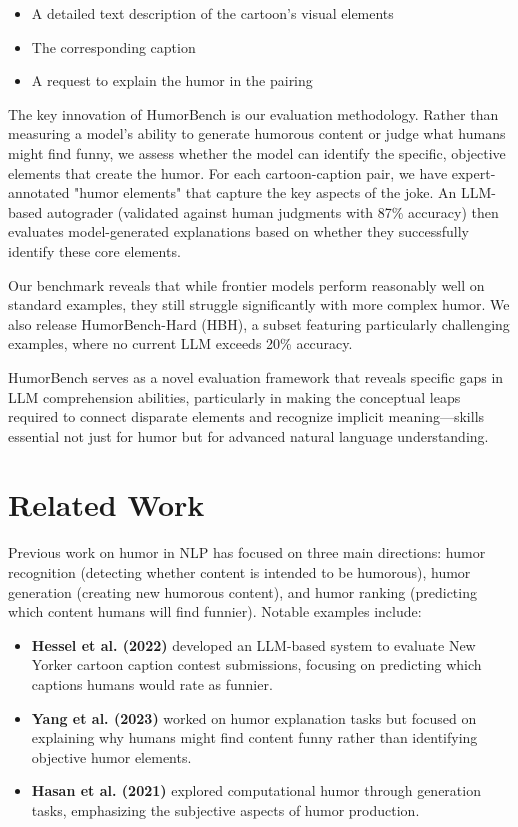 \documentclass[twocolumn]{article}
\begin{document}
\begin{itemize}
    \item A detailed text description of the cartoon's visual elements
    \item The corresponding caption
    \item A request to explain the humor in the pairing
\end{itemize}

The key innovation of HumorBench is our evaluation methodology. Rather than measuring a model's ability to generate humorous content or judge what humans might find funny, we assess whether the model can identify the specific, objective elements that create the humor. For each cartoon-caption pair, we have expert-annotated "humor elements" that capture the key aspects of the joke. An LLM-based autograder (validated against human judgments with 87\% accuracy) then evaluates model-generated explanations based on whether they successfully identify these core elements.

Our benchmark reveals that while frontier models perform reasonably well on standard examples, they still struggle significantly with more complex humor. We also release HumorBench-Hard (HBH), a subset featuring particularly challenging examples, where no current LLM exceeds 20\% accuracy.

HumorBench serves as a novel evaluation framework that reveals specific gaps in LLM comprehension abilities, particularly in making the conceptual leaps required to connect disparate elements and recognize implicit meaning—skills essential not just for humor but for advanced natural language understanding.

\section{Related Work}
Previous work on humor in NLP has focused on three main directions: humor recognition (detecting whether content is intended to be humorous), humor generation (creating new humorous content), and humor ranking (predicting which content humans will find funnier). Notable examples include:

\begin{itemize}
    \item \textbf{Hessel et al. (2022)} developed an LLM-based system to evaluate New Yorker cartoon caption contest submissions, focusing on predicting which captions humans would rate as funnier.
    \item \textbf{Yang et al. (2023)} worked on humor explanation tasks but focused on explaining why humans might find content funny rather than identifying objective humor elements.
    \item \textbf{Hasan et al. (2021)} explored computational humor through generation tasks, emphasizing the subjective aspects of humor production.
\end{itemize}
\end{document}
